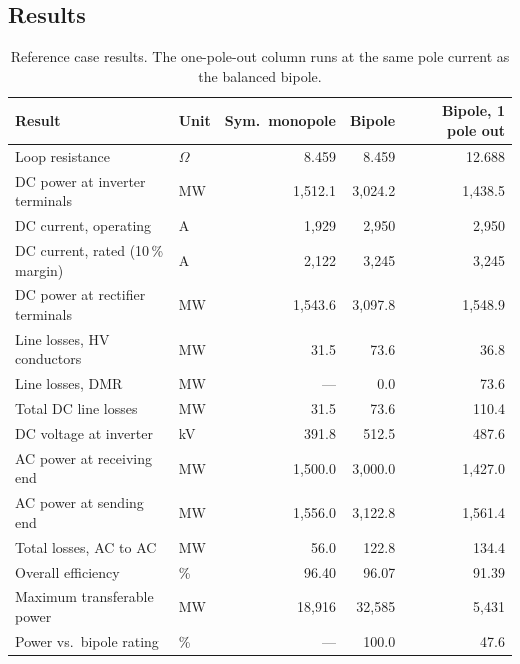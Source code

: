 \subsection{Results}
\begin{table}[htbp]
  \centering
  \renewcommand{\arraystretch}{1.25}
  \begin{tabularx}{\linewidth}{@{}X l r r r@{}}
    \toprule
    \textbf{Result} & \textbf{Unit} &
    \textbf{Sym.\ monopole} & \textbf{Bipole} &
    \textbf{Bipole, 1 pole out} \\
    \midrule
    Loop resistance                  & $\Omega$ & 8.459   & 8.459   & 12.688  \\
    DC power at inverter terminals   & MW       & 1{,}512.1 & 3{,}024.2 & 1{,}438.5 \\
    DC current, operating            & A        & 1{,}929 & 2{,}950 & 2{,}950 \\
    DC current, rated (10\,\% margin)& A        & 2{,}122 & 3{,}245 & 3{,}245 \\
    DC power at rectifier terminals  & MW       & 1{,}543.6 & 3{,}097.8 & 1{,}548.9 \\
    Line losses, HV conductors       & MW       & 31.5    & 73.6    & 36.8    \\
    Line losses, DMR                 & MW       & ---     & 0.0     & 73.6    \\
    Total DC line losses             & MW       & 31.5    & 73.6    & 110.4   \\
    DC voltage at inverter           & kV       & 391.8   & 512.5   & 487.6   \\
    AC power at receiving end        & MW       & 1{,}500.0 & 3{,}000.0 & 1{,}427.0 \\
    AC power at sending end          & MW       & 1{,}556.0 & 3{,}122.8 & 1{,}561.4 \\
    Total losses, AC to AC           & MW       & 56.0    & 122.8   & 134.4   \\
    Overall efficiency               & \%       & 96.40   & 96.07   & 91.39   \\
    Maximum transferable power       & MW       & 18{,}916 & 32{,}585 & 5{,}431 \\
    Power vs.\ bipole rating         & \%       & ---     & 100.0   & 47.6    \\
    \bottomrule
  \end{tabularx}
  \caption{Reference case results. The one-pole-out column runs at the same
           pole current as the balanced bipole.}
  \label{tab:refresults}
\end{table}

